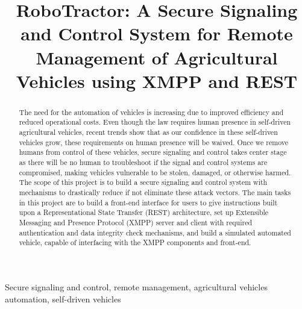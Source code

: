 \documentclass[conference,12pt]{IEEEtran}
\begin{document}
%
\title{RoboTractor: A Secure Signaling and Control System for Remote Management of Agricultural Vehicles using XMPP and REST}
\author{
\and
{}
\and
{}
}
\maketitle


\begin{abstract}
The need for the automation of vehicles is increasing due to improved
efficiency and reduced operational costs. Even though the law requires human
presence in self-driven agricultural vehicles, recent trends show that as
our confidence in these self-driven vehicles grow, these requirements on
human presence will be waived. Once we remove humans from control of these
vehicles, secure signaling and control takes center stage as there will be
no human to troubleshoot if the signal and control systems are compromised,
making vehicles vulnerable to be stolen, damaged, or otherwise harmed. The
scope of this project is to build a secure signaling and control system with
mechanisms to drastically reduce if not eliminate these attack vectors. The
main tasks in this project are to build a front-end interface for users to
give instructions built upon a Representational State Transfer (REST)
architecture, set up Extensible Messaging and Presence Protocol (XMPP)
server and client with required authentication and data integrity check
mechanisms, and build a simulated automated vehicle, capable of
interfacing with the XMPP components and front-end.  
\end{abstract}

\begin{IEEEkeywords}
    Secure signaling and control, remote management, agricultural vehicles automation, self-driven vehicles
\end{IEEEkeywords}
\end{document}
